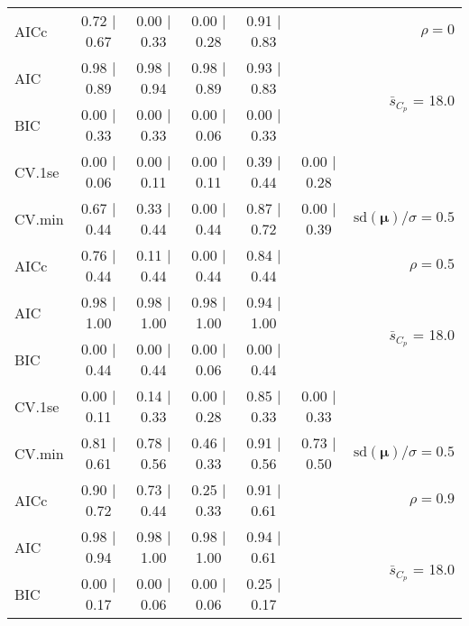 \documentclass[12pt]{article}
\newcommand{\mr}[1]{\mathrm{#1}}
\newcommand{\bm}[1]{\mathbf{#1}}
\begin{document}
\begin{table}[p]
\begin{center}
\begin{tabular}{l*{5}{c}|r}
AICc & 0.72 $\mid$ 0.67 & 0.00 $\mid$ 0.33 & 0.00 $\mid$ 0.28 & 0.91 $\mid$ 0.83 & & $\rho=0$ \\
AIC & 0.98 $\mid$ 0.89 & 0.98 $\mid$ 0.94 & 0.98 $\mid$ 0.89 & 0.93 $\mid$ 0.83 & & \multirow{2}{*}{$\bar{s}_{C_p}$ = 18.0} \\
BIC & 0.00 $\mid$ 0.33 & 0.00 $\mid$ 0.33 & 0.00 $\mid$ 0.06 & 0.00 $\mid$ 0.33 & & \\
 \hline 
CV.1se & 0.00 $\mid$ 0.06 & 0.00 $\mid$ 0.11 & 0.00 $\mid$ 0.11 & 0.39 $\mid$ 0.44 & 0.00 $\mid$ 0.28 &\\
CV.min & 0.67 $\mid$ 0.44 & 0.33 $\mid$ 0.44 & 0.00 $\mid$ 0.44 & 0.87 $\mid$ 0.72 & 0.00 $\mid$ 0.39 &  $\mr{sd}(\bm{\mu})/\sigma=0.5$ \\
AICc & 0.76 $\mid$ 0.44 & 0.11 $\mid$ 0.44 & 0.00 $\mid$ 0.44 & 0.84 $\mid$ 0.44 & & $\rho=0.5$ \\
AIC & 0.98 $\mid$ 1.00 & 0.98 $\mid$ 1.00 & 0.98 $\mid$ 1.00 & 0.94 $\mid$ 1.00 & & \multirow{2}{*}{$\bar{s}_{C_p}$ = 18.0} \\
BIC & 0.00 $\mid$ 0.44 & 0.00 $\mid$ 0.44 & 0.00 $\mid$ 0.06 & 0.00 $\mid$ 0.44 & & \\
 \hline 
CV.1se & 0.00 $\mid$ 0.11 & 0.14 $\mid$ 0.33 & 0.00 $\mid$ 0.28 & 0.85 $\mid$ 0.33 & 0.00 $\mid$ 0.33 &\\
CV.min & 0.81 $\mid$ 0.61 & 0.78 $\mid$ 0.56 & 0.46 $\mid$ 0.33 & 0.91 $\mid$ 0.56 & 0.73 $\mid$ 0.50 &  $\mr{sd}(\bm{\mu})/\sigma=0.5$ \\
AICc & 0.90 $\mid$ 0.72 & 0.73 $\mid$ 0.44 & 0.25 $\mid$ 0.33 & 0.91 $\mid$ 0.61 & & $\rho=0.9$ \\
AIC & 0.98 $\mid$ 0.94 & 0.98 $\mid$ 1.00 & 0.98 $\mid$ 1.00 & 0.94 $\mid$ 0.61 & & \multirow{2}{*}{$\bar{s}_{C_p}$ = 18.0} \\
BIC & 0.00 $\mid$ 0.17 & 0.00 $\mid$ 0.06 & 0.00 $\mid$ 0.06 & 0.25 $\mid$ 0.17 & & \\
 \hline 
 \end{tabular}
\end{center}
\vspace{-1cm}
\end{table}
\end{document}
